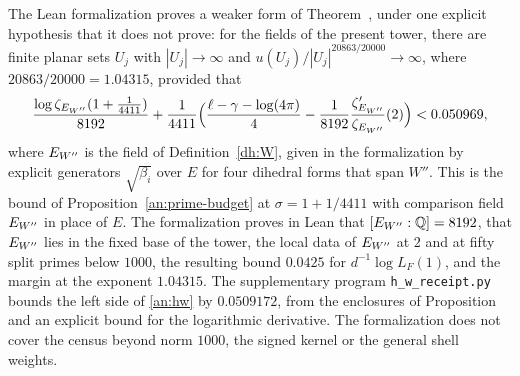 \begin{remark}\label{an:lean-hypothesis}
The Lean formalization \cite{NaslundLeanW} proves a weaker form of
Theorem~, under one explicit hypothesis that it does not
prove: for the fields of the present tower, there are finite planar sets
$U_j$ with $|U_j|\to\infty$ and $u(U_j)/|U_j|^{20863/20000}\to\infty$, where
$20863/20000=1.04315$, provided that
\begin{equation}\label{an:hw}
 \frac{\log\zeta_{E_{W''}}(1+\frac1{4411})}{8192}
 +\frac1{4411}\Bigl(\frac{\ell-\gamma-\log(4\pi)}4
 -\frac1{8192}\frac{\zeta_{E_{W''}}'}{\zeta_{E_{W''}}}(2)\Bigr)<0.050969,
\end{equation}
where $E_{W''}$ is the field of Definition~\ref{dh:W}, given in the
formalization by explicit generators $\sqrt{\beta_i}$ over $E$ for four
dihedral forms that span $W''$. This is the bound of
Proposition~\ref{an:prime-budget} at $\sigma=1+1/4411$ with comparison field
$E_{W''}$ in place of $E$. The formalization proves in Lean that
$[E_{W''}:\mathbb Q]=8192$, that $E_{W''}$ lies in the fixed base of the tower, the local
data of $E_{W''}$ at $2$ and at fifty split primes below $1000$, the resulting
bound $0.0425$ for $d^{-1}\log L_F(1)$, and the margin at the exponent
$1.04315$. The supplementary program \texttt{h\_w\_receipt.py} bounds the
left side of \eqref{an:hw} by $0.0509172$, from the enclosures of
Proposition~ and an explicit bound for the logarithmic
derivative. The formalization does not cover the census beyond norm $1000$,
the signed kernel or the general shell weights.
\end{remark}

